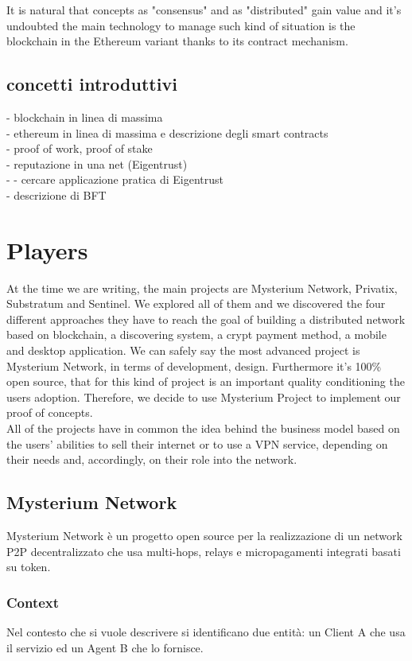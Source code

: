 \documentclass[]{article}
\begin{document}
	It is natural that concepts as "consensus" and as "distributed" gain value and it's undoubted the main technology to manage such kind of situation is the blockchain in the Ethereum variant thanks to its contract mechanism.\\
	

	\subsection{concetti introduttivi}
	 - blockchain in linea di massima\\
	 - ethereum in linea di massima e descrizione degli smart contracts\\
	 - proof of work, proof of stake\\
	 - reputazione in una net (Eigentrust)\\
	 - - cercare applicazione pratica di Eigentrust\\
	 - descrizione di BFT\\
	
	
	\section{Players}
	At the time we are writing, the main projects are Mysterium Network, Privatix, Substratum and Sentinel. We explored all of them and we discovered the four different approaches they have to reach the goal of building a distributed network based on blockchain, a discovering system, a crypt payment method, a mobile and desktop application. We can safely say the most advanced project is Mysterium Network, in terms of development, design. Furthermore it's 100\% open source, that for this kind of project is an important quality conditioning the users adoption.
	Therefore, we decide to use Mysterium Project to implement our proof of concepts.\\
	All of the projects have in common the idea behind the business model based on the users' abilities to sell their internet or to use a VPN service, depending on their needs and, accordingly, on their role into the network.
	
	
	\subsection{Mysterium Network}
	Mysterium Network è un progetto open source per la realizzazione di un network P2P decentralizzato che usa multi-hops, relays e micropagamenti integrati basati su token.	
	
	\subsubsection{Context}
	Nel contesto che si vuole descrivere si identificano due entità: un Client A che usa il servizio ed un Agent B che lo fornisce.	
\end{document}
